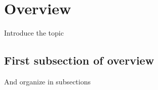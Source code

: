 \section{Overview}

Introduce the topic

\subsection{First subsection of overview} 

And organize in subsections